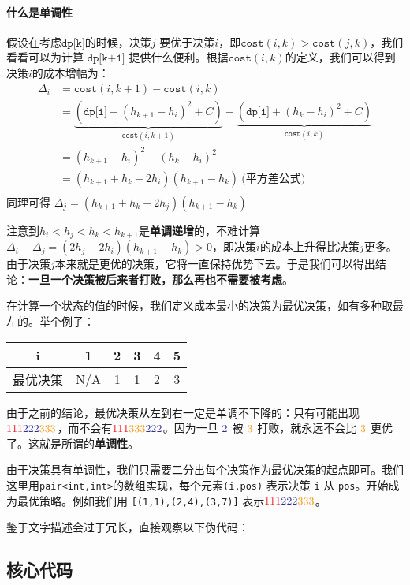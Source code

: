 \paragraph{什么是单调性}假设在考虑$\texttt{dp[k]}$的时候，决策$j$ 要优于决策$i$，即$\texttt{cost}(i,k) > \texttt{cost}(j,k)$，我们看看可以为计算 $\texttt{dp[k+1]}$ 提供什么便利。根据$\texttt{cost}(i,k)$的定义，我们可以得到决策$i$的成本增幅为：
\begin{equation*} 
\begin{split}
    \Delta_i 
    &= \texttt{cost}(i,k+1) - \texttt{cost}(i,k) \\
    &= \underbrace{(\texttt{dp[i]} + (h_{k+1} - h_i)^2+C)}_{\texttt{cost}(i,k+1)} - \underbrace{(\texttt{dp[i]} + (h_k - h_i)^2+C)}_{\texttt{cost}(i,k)}\\
    &= (h_{k+1} - h_i)^2 - (h_k - h_i)^2\\
    &= (h_{k+1} + h_k - 2h_i)(h_{k+1} - h_k) \ \textbf{(平方差公式)}\\
\end{split}
\end{equation*}
同理可得 $ \Delta_j   = (h_{k+1} + h_k - 2h_j)(h_{k+1} - h_k)$

注意到$h_i < h_j < h_k < h_{k+1}$是\textbf{单调递增}的，不难计算 $\Delta_i -  \Delta_j  = (2h_j-2h_i)(h_{k+1} - h_k) > 0$，即决策$i$的成本上升得比决策$j$更多。由于决策$j$本来就是更优的决策，它将一直保持优势下去。于是我们可以得出结论：\textbf{一旦一个决策被后来者打败，那么再也不需要被考虑}。

在计算一个状态的值的时候，我们定义成本最小的决策为最优决策，如有多种取最左的。举个例子：
\begin{center}
\begin{tabular}{ |c|c|c|c|c|c| } 
 \hline
 i & 1 &2 &3& 4& 5\\
 \hline
 最优决策 & N/A &1 &1& 2& 3\\
 \hline
\end{tabular}
\end{center}

由于之前的结论，最优决策从左到右一定是单调不下降的：只有可能出现 $\color{Red}{111}\color{Blue}{222}\color{YellowOrange}{333}$，而不会有$\color{Red}{111}\color{YellowOrange}{333}\color{Blue}{222}$。因为一旦 $\color{Blue}{2}$ 被 $\color{YellowOrange}{3}$ 打败，就永远不会比 $\color{YellowOrange}{3}$ 更优了。这就是所谓的\textbf{单调性}。

由于决策具有单调性，我们只需要二分出每个决策作为最优决策的起点即可。我们这里用\texttt{pair<int,int>}的数组实现，每个元素\texttt{(i,pos)} 表示决策 \texttt{i} 从 \texttt{pos}。开始成为最优策略。例如我们用 \texttt{[(1,1),(2,4),(3,7)]} 表示$\color{Red}{111}\color{Blue}{222}\color{YellowOrange}{333}$。


鉴于文字描述会过于冗长，直接观察以下伪代码：
\subsection*{核心代码}
\inputminted[linenos,autogobble]{python}{../Code/Z2.py}

\newpage